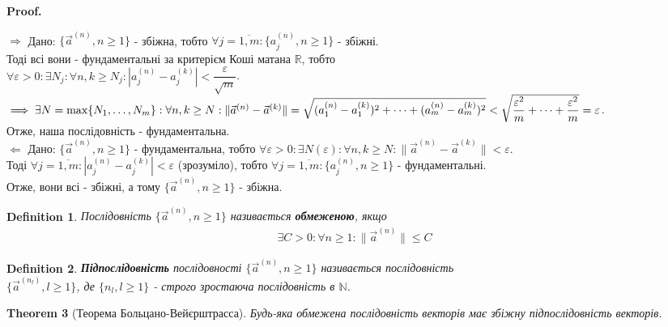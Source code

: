 \documentclass[a4paper, 10pt]{article}
\makeatletter
\def\qed{$\blacksquare$}
\def\rightproof{$\boxed{\Rightarrow}$ }
\def\leftproof{$\boxed{\Leftarrow}$ }
\theoremstyle{theoremdd}
\newtheorem{theorem}{Theorem}[subsection]
\theoremstyle{theoremdd}
\theoremstyle{theoremdd}
\newtheorem{definition}[theorem]{Definition}
\theoremstyle{theoremdd}
\theoremstyle{theoremdd}
\theoremstyle{theoremdd}
\theoremstyle{theoremdd}
\theoremstyle{theoremdd}
\theoremstyle{theoremdd}
\renewenvironment{proof}[1][Proof.\\]{\par
\pushQED{\hfill \qed}%
\normalfont \topsep6\p@\@plus6\p@\relax
\trivlist
\item\relax
{\bfseries
#1\@addpunct{.}}\hspace\labelsep\ignorespaces
}{%
\popQED\endtrivlist\@endpefalse
}
\newcommand\Norm[1]{\lVert#1\rVert}
\makeatother
\begin{document}
\begin{proof}
\rightproof Дано: $\{\vec{a}^{(n)}, n \geq 1 \}$ - збіжна, тобто $\forall j = \overline{1,m}: \{a_j^{(n)}, n \geq 1\}$ - збіжні.\\
Тоді всі вони - фундаментальні за критерієм Коші матана $\mathbb{R}$, тобто \\ $\forall \varepsilon > 0: \exists N_j: \forall n,k \geq N_j: |a_j^{(n)} - a_j^{(k)}| < \dfrac{\varepsilon}{\sqrt{m}}$.\\
$\implies \exists N = \max\{N_1,\dots,N_m\}: \forall n,k \geq N: \\ \Norm{\vec{a}^{(n)} - \vec{a}^{(k)}} = \sqrt{(a_1^{(n)} - a_1^{(k)})^2 + \dots + (a_m^{(n)} - a_m^{(k)})^2} < \sqrt{\dfrac{\varepsilon^2}{m} + \dots + \dfrac{\varepsilon^2}{m}} = \varepsilon$.\\
Отже, наша послідовність - фундаментальна.
\bigskip \\
\leftproof Дано: $\{\vec{a}^{(n)}, n \geq 1 \}$ - фундаментальна, тобто $\forall \varepsilon > 0: \exists N(\varepsilon): \forall n, k \geq N: \Norm{\vec{a}^{(n)} - \vec{a}^{(k)}} < \varepsilon$.\\
Тоді $\forall j = \overline{1,m}: |a_j^{(n)} - a_j^{(k)}| < \varepsilon$ (зрозуміло), тобто $\forall j = \overline{1,m}: \{a_j^{(n)}, n \geq 1\}$ - фундаментальні.\\
Отже, вони всі - збіжні, а тому $\{\vec{a}^{(n)}, n \geq 1 \}$ - збіжна.
\end{proof}

\begin{definition}
Послідовність $\{\vec{a}^{(n)}, n \geq 1 \}$ називається \textbf{обмеженою}, якщо
\begin{align*}
\exists C > 0: \forall n \geq 1: \Norm{\vec{a}^{(n)}} \leq C
\end{align*}
\end{definition}

\begin{definition}
\textbf{Підпослідовність} послідовності $\{\vec{a}^{(n)}, n \geq 1 \}$ називається послідовність \\ $\{\vec{a}^{(n_l)}, l \geq 1 \}$, де $\{n_l, l \geq 1 \}$ - строго зростаюча послідовність в $\mathbb{N}$.
\end{definition}

\begin{theorem}[Теорема Больцано-Вейєрштрасса]
Будь-яка обмежена послідовність векторів має збіжну підпослідовність векторів.
\end{theorem}
\end{document}
